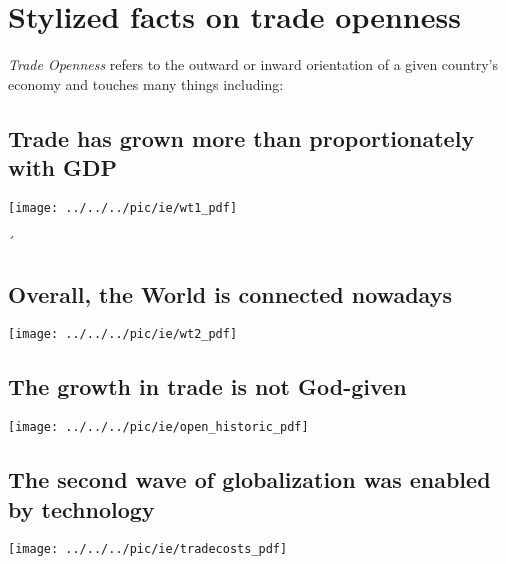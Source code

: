 \section{Stylized facts on trade openness}\label{sec:Stylized facts on trade openness}
\textit{Trade Openness} refers to the outward or inward orientation of a given country's economy and touches many things including:

\pbn

\subsection*{Trade has grown more than proportionately with GDP}
\begin{center}
	\texttt{[image: ../../../pic/ie/wt1\_pdf]}
\end{center}

´\subsection*{Overall, the World is connected nowadays}
\begin{center}
	\texttt{[image: ../../../pic/ie/wt2\_pdf]}
\end{center}

\subsection*{The growth in trade is not God-given }
\begin{center}
	\texttt{[image: ../../../pic/ie/open\_historic\_pdf]}
\end{center}

\subsection*{The second wave of globalization was enabled by technology}
\begin{center}
	\texttt{[image: ../../../pic/ie/tradecosts\_pdf]}
\end{center}

